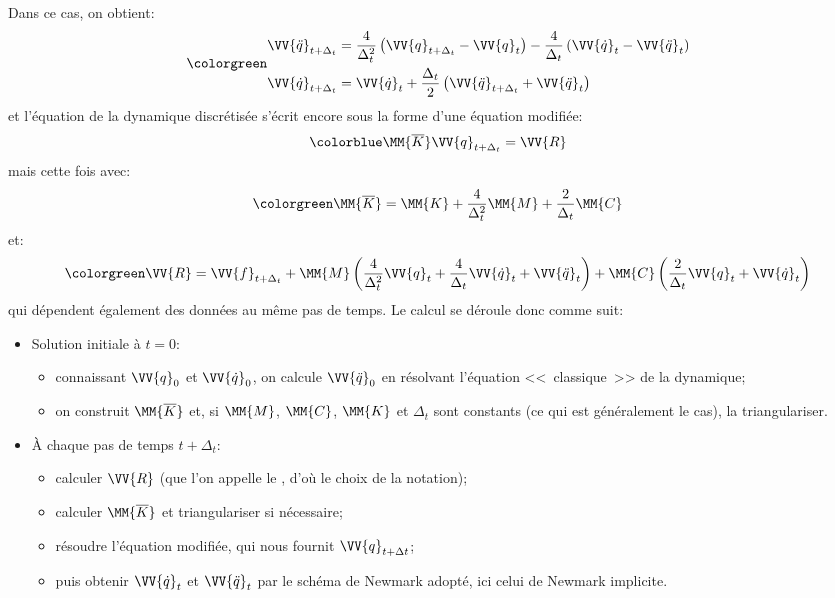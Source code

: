 Dans ce cas, on obtient:
\begin{equation}\colorgreen
\begin{aligned}
&\VV{\ddot q}_{t+\Delta_t} = \frac4{\Delta_t^2} \left( \VV{q}_{t+\Delta_t} -\VV{q}_t\right)
-\frac4{\Delta_t}\left( \VV{\dot q}_t - \VV{\ddot q}_t\right)\\
&\VV{\dot q}_{t+\Delta_t} = \VV{\dot q}_t + \frac{\Delta_t}2\left( \VV{\ddot q}_{t+\Delta_t} + \VV{\ddot q}_t\right)
\end{aligned}
\end{equation}
et l'équation de la dynamique discrétisée s'écrit encore sous la forme d'une équation modifiée:
\begin{equation}\colorblue
\MM{\overline{K}} \VV{q}_{t+\Delta_t} = \VV{R}
\end{equation}
mais cette fois avec:
\begin{equation}\colorgreen
\MM{\overline{K}} = \MM{K}+\frac4{\Delta_t^2}\MM{M}+\frac2{\Delta_t}\MM{C}
\end{equation}
et:
\begin{equation}\colorgreen
\VV{R} = \VV{f}_{t+\Delta_t} + \MM{M}\left(\frac4{\Delta_t^2}\VV{q}_t + \frac4{\Delta_t}\VV{\dot q}_t
+ \VV{\ddot q}_t\right)
+\MM{C}\left( \frac2{\Delta_t}\VV{q}_t + \VV{\dot q}_t\right)
\end{equation}
qui dépendent également des données au même pas de temps.
\medskip
Le calcul se déroule donc comme suit:
\begin{itemize}
   \item Solution initiale à $t=0$:
	\begin{itemize}
	\item connaissant $\VV{q}_0$ et $\VV{\dot q}_0$, on calcule $\VV{\ddot q}_0$ en résolvant
	l'équation <<~classique~>> de la dynamique;
	\item on construit $\MM{\overline{K}}$ et, si $\MM{M}$, $\MM{C}$, $\MM{K}$ et $\Delta_t$ sont constants
	(ce qui est généralement le cas), la triangulariser.
	\end{itemize}
   \item À chaque pas de temps $t+\Delta_t$:
	\begin{itemize}
	\item calculer $\VV{R}$ (que l'on appelle le , d'où le choix de la notation);
	\item calculer $\MM{\overline{K}}$ et triangulariser si nécessaire;
	\item résoudre l'équation modifiée, qui nous fournit $\VV{q}_{t+\Delta t}$;
	\item puis obtenir $\VV{\dot q}_t$ et $\VV{\ddot q}_t$ par le schéma de Newmark adopté,
	ici celui de Newmark implicite.
	\end{itemize}
\end{itemize}
